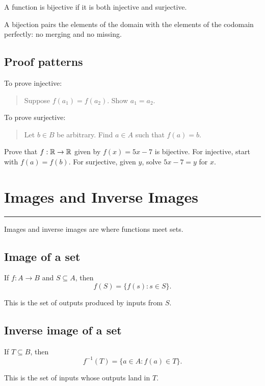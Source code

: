 \documentclass[12pt]{article}
\newcommand{\chapterline}{\vspace{0.4em}\hrule\vspace{0.8em}}
\begin{document}
\begin{definition}
A function is bijective if it is both injective and surjective.
\end{definition}

A bijection pairs the elements of the domain with the elements of the codomain perfectly: no merging and no missing.

\subsection{Proof patterns}

To prove injective:

\begin{quote}
Suppose $f(a_1)=f(a_2)$. Show $a_1=a_2$.
\end{quote}

To prove surjective:

\begin{quote}
Let $b\in B$ be arbitrary. Find $a\in A$ such that $f(a)=b$.
\end{quote}

\begin{labbox}
Prove that $f:\mathbb{R}\to\mathbb{R}$ given by $f(x)=5x-7$ is bijective. For injective, start with $f(a)=f(b)$. For surjective, given $y$, solve $5x-7=y$ for $x$.
\end{labbox}

\newpage
\section{Images and Inverse Images}
\chapterline

Images and inverse images are where functions meet sets.

\subsection{Image of a set}

If $f:A\to B$ and $S\subseteq A$, then
\[
f(S)=\{f(s):s\in S\}.
\]

This is the set of outputs produced by inputs from $S$.

\subsection{Inverse image of a set}

If $T\subseteq B$, then
\[
f^{-1}(T)=\{a\in A:f(a)\in T\}.
\]

This is the set of inputs whose outputs land in $T$.
\end{document}

